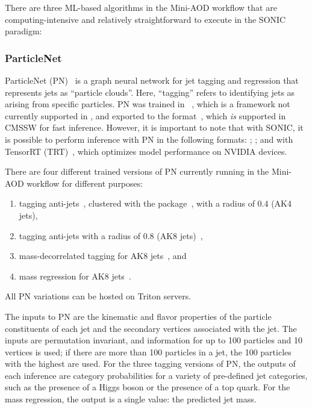 There are three ML-based algorithms in the Mini-AOD workflow that are computing-intensive and relatively straightforward to execute in the SONIC paradigm:

\subsubsection{ParticleNet}
\label{sec:PN}

ParticleNet (PN)~\cite{Qu:2019gqs} is a graph neural network for jet tagging and regression that represents jets as ``particle clouds''. Here, ``tagging'' refers to identifying jets as arising from specific particles. PN was trained in \PYTORCH~\cite{pytorch}, which is a framework not currently supported in \CMSSW, and exported to the \ONNX format~\cite{onnx}, which \textit{is} supported in CMSSW for fast inference. However, it is important to note that with SONIC, it is possible to perform inference with PN in the following formats: \ONNX; \PYTORCH; and \PYTORCH with TensorRT (TRT)~\cite{tensorRT}, which optimizes model performance on NVIDIA devices.

There are four different trained versions of PN currently running in the Mini-AOD workflow for different purposes:
\begin{enumerate}
    \item tagging anti-\kt jets~\cite{Cacciari:2008gp}, clustered with the \FASTJET package~\cite{Cacciari:2011ma}, with a radius of 0.4 (AK4 jets),
    \item tagging anti-\kt jets with a radius of 0.8 (AK8 jets)~\cite{Sirunyan:2020lcu},
    \item mass-decorrelated tagging for AK8 jets~\cite{Sirunyan:2020lcu}, and
    \item mass regression for AK8 jets~\cite{CMS-DP-2021-017}.
\end{enumerate}
All PN variations can be hosted on Triton servers.

The inputs to PN are the kinematic and flavor properties of the particle constituents of each jet and the secondary vertices associated with the jet. The inputs are permutation invariant, and information for up to 100 particles and 10 vertices is used; if there are more than 100 particles in a jet, the 100 particles with the highest \pt are used. For the three tagging versions of PN, the outputs of each inference are category probabilities for a variety of pre-defined jet categories, such as the presence of a Higgs boson or the presence of a top quark. For the mass regression, the output is a single value: the predicted jet mass.


